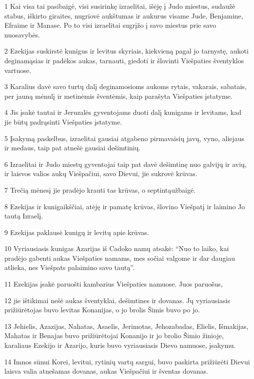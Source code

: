 \par 1 Kai visa tai pasibaigė, visi susirinkę izraelitai, išėję į Judo miestus, sudaužė stabus, iškirto giraites, nugriovė aukštumas ir aukurus visame Jude, Benjamine, Efraime ir Manase. Po to visi izraelitai sugrįžo į savo miestus prie savo nuosavybės. 
\par 2 Ezekijas suskirstė kunigus ir levitus skyriais, kiekvieną pagal jo tarnystę, aukoti deginamąsias ir padėkos aukas, tarnauti, giedoti ir šlovinti Viešpaties šventyklos vartuose. 
\par 3 Karalius davė savo turtų dalį deginamosioms aukoms rytais, vakarais, sabatais, per jauną mėnulį ir metinėmis šventėmis, kaip parašyta Viešpaties įstatyme. 
\par 4 Jis įsakė tautai ir Jeruzalės gyventojams duoti dalį kunigams ir levitams, kad jie būtų padrąsinti Viešpaties įstatyme. 
\par 5 Įsakymą paskelbus, izraelitai gausiai atgabeno pirmavaisių javų, vyno, aliejaus ir medaus, taip pat atnešė gausiai dešimtinių. 
\par 6 Izraelitai ir Judo miestų gyventojai taip pat davė dešimtinę nuo galvijų ir avių, ir laisvos valios aukų Viešpačiui, savo Dievui, jie sukrovė krūvas. 
\par 7 Trečią mėnesį jie pradėjo krauti tas krūvas, o septintą­užbaigė. 
\par 8 Ezekijas ir kunigaikščiai, atėję ir pamatę krūvas, šlovino Viešpatį ir laimino Jo tautą Izraelį. 
\par 9 Ezekijas paklausė kunigų ir levitų apie krūvas. 
\par 10 Vyriausiasis kunigas Azarijas iš Cadoko namų atsakė: “Nuo to laiko, kai pradėjo gabenti aukas Viešpaties namams, mes sočiai valgome ir dar daugiau atlieka, nes Viešpats palaimino savo tautą”. 
\par 11 Ezekijas įsakė paruošti kambarius Viešpaties namuose. Juos paruošus, 
\par 12 jie ištikimai nešė aukas šventyklai, dešimtines ir dovanas. Jų vyriausiasis prižiūrėtojas buvo levitas Konanijas, o jo brolis Šimis buvo po jo. 
\par 13 Jehielis, Azazijas, Nahatas, Asaelis, Jerimotas, Jehozabadas, Elielis, Išmakijas, Mahatas ir Benajas buvo prižiūrėtojai Konanijo ir jo brolio Šimio žinioje, karaliaus Ezekijo ir Azarijo, kuris buvo vyriausiasis Dievo namuose, įsakymu. 
\par 14 Imnos sūnui Korei, levitui, rytinių vartų sargui, buvo paskirta prižiūrėti Dievui laisva valia atnešamas dovanas, aukas Viešpačiui ir šventas dovanas. 
